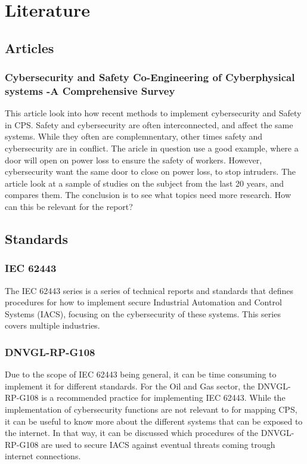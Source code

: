\section{Literature} \label{sec:literature}
\subsection{Articles} \label{sec:articles}
\subsubsection{Cybersecurity and Safety Co-Engineering of Cyberphysical systems -A Comprehensive Survey}
This article look into how recent methods to implement cybersecurity and Safety in CPS. Safety and cybersecurity are often interconnected, and affect the same systems. While they often are complemnentary, other times safety and cybersecurity are in conflict. The aricle in question use a good example, where a door will open on power loss to ensure the safety of workers. However, cybersecurity want the same door to close on power loss, to stop intruders. The article look at a sample of studies on the subject from the last 20 years, and compares them. The conclusion is to see what topics need more research. How can this be relevant for the report?

\subsection{Standards} \label{sec:standards}
\subsubsection{IEC 62443} \label{sec:IEC62443}
The IEC 62443 series is a series of technical reports and standards that defines procedures for how to implement secure Industrial Automation and Control Systems (IACS), focusing on the cybersecurity of these systems. This series covers multiple industries.

\subsubsection{DNVGL-RP-G108} \label{sec:G108}
Due to the scope of IEC 62443 being general, it can be time consuming to implement it for different standards.
For the Oil and Gas sector, the DNVGL-RP-G108 is a recommended practice for implementing IEC 62443. While the implementation of cybersecurity functions are not relevant to for mapping CPS, it can be useful to know more about the different systems that can be exposed to the internet. In that way, it can be discussed which procedures of the DNVGL-RP-G108 are used to secure IACS against eventual threats coming trough internet connections.
